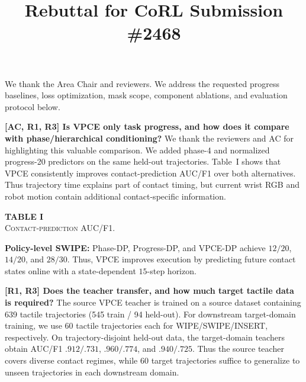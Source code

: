 \documentclass[conference]{IEEEtran}
\newcommand{\newparagraph}[1]{{\bf #1}}
\begin{document}
\title{Rebuttal for CoRL Submission \#2468\vspace{-1cm}}
\maketitle
\thispagestyle{empty}

We thank the Area Chair and reviewers. We address the requested progress
baselines, loss optimization, mask scope, component ablations, and evaluation
protocol below.

\newparagraph{[AC, R1, R3] Is VPCE only task progress, and how does it compare
with phase/hierarchical conditioning?}
We thank the reviewers and AC for highlighting this valuable comparison. We
added phase-4 and normalized progress-20 predictors on the same held-out
trajectories. Table~I shows that VPCE consistently improves contact-prediction
AUC/F1 over both alternatives. Thus trajectory time explains part of contact
timing, but current wrist RGB and robot motion contain additional
contact-specific information.

\begin{table}
  \vspace{-6pt}
  \centering\scriptsize
  \textbf{TABLE I}\\[-1pt]
  \textsc{Contact-prediction AUC/F1.}\\[2pt]
  \setlength{\tabcolsep}{0.5pt}
  \vspace{-6pt}
\end{table}
\noindent\textbf{Policy-level SWIPE:} Phase-DP, Progress-DP, and VPCE-DP
achieve $12/20$, $14/20$, and $28/30$. Thus, VPCE improves execution by
predicting future contact states online with a state-dependent $15$-step
horizon.

\newparagraph{[R1, R3] Does the teacher transfer, and how much target tactile
data is required?}
The source VPCE teacher is trained on a source dataset containing 639
  tactile trajectories (545 train / 94 held-out).
  For downstream target-domain training, we use 60 tactile trajectories each
  for
  WIPE/SWIPE/INSERT, respectively. On trajectory-disjoint held-out data, the
  target-domain teachers obtain AUC/F1 $.912/.731$, $.960/.774$, and
  $.940/.725$.
  Thus the source teacher covers diverse contact regimes, while $60$ target
  trajectories suffice to generalize to unseen trajectories in each
  downstream
  domain.
\end{document}
